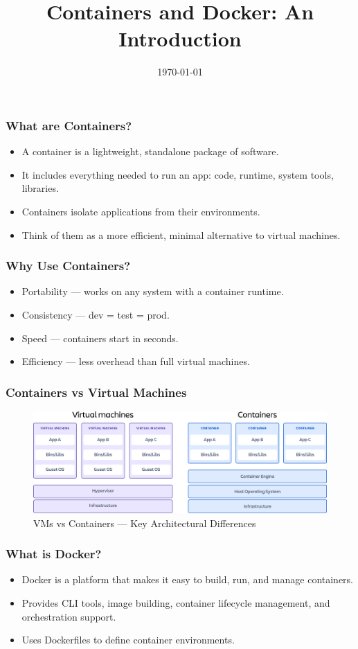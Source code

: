 \documentclass{beamer}
\title{Containers and Docker: An Introduction}
\date{\today}
\begin{document}
\frame{\titlepage}

\begin{frame}
\frametitle{What are Containers?}
\begin{itemize}
    \item A container is a lightweight, standalone package of software.
    \item It includes everything needed to run an app: code, runtime, system tools, libraries.
    \item Containers isolate applications from their environments.
    \item Think of them as a more efficient, minimal alternative to virtual machines.
\end{itemize}
\end{frame}

\begin{frame}
\frametitle{Why Use Containers?}
\begin{itemize}
    \item Portability — works on any system with a container runtime.
    \item Consistency — dev = test = prod.
    \item Speed — containers start in seconds.
    \item Efficiency — less overhead than full virtual machines.
\end{itemize}
\end{frame}

\begin{frame}
\frametitle{Containers vs Virtual Machines}
\centering
\begin{figure}
    \centering
    \includegraphics[width=0.9\linewidth]{images/image.png}
    \caption{VMs vs Containers — Key Architectural Differences}
    \label{fig:enter-label}
\end{figure}
\end{frame}

\begin{frame}
\frametitle{What is Docker?}
\begin{itemize}
    \item Docker is a platform that makes it easy to build, run, and manage containers.
    \item Provides CLI tools, image building, container lifecycle management, and orchestration support.
    \item Uses Dockerfiles to define container environments.
\end{itemize}
\end{frame}
\end{document}

